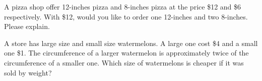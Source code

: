 \newpage

\begin{exercise}
	A pizza shop offer 12-inches pizza and 8-inches pizza at the price \$12 and \$6 respectively.  With \$12, would you like to order one 12-inches and two 8-inches. Please explain.
\end{exercise}

\vfill
\begin{center}
	\hfill
\end{center}

\begin{exercise}
	A store has large size and small size watermelons. A large one cost \$4 and a small one \$1. The circumference of a larger watermelon is approximately twice of the circumference of a smaller one. Which size of watermelons is cheaper if it was sold by weight? 
\end{exercise}

\vfill
\begin{center}
	\hfill
\end{center}
